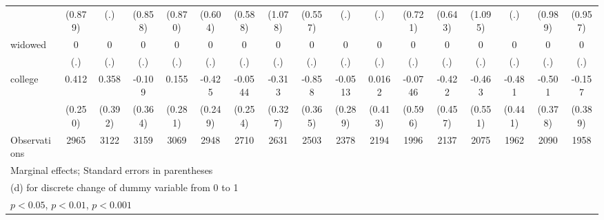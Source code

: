 {\begin{tabular}{l*{16}{c}}
                    &     (0.879)         &         (.)         &     (0.858)         &     (0.870)         &     (0.604)         &     (0.588)         &     (1.078)         &     (0.557)         &         (.)         &         (.)         &     (0.721)         &     (0.643)         &     (1.095)         &         (.)         &     (0.989)         &     (0.957)         \\
[1em]
widowed             &           0         &           0         &           0         &           0         &           0         &           0         &           0         &           0         &           0         &           0         &           0         &           0         &           0         &           0         &           0         &           0         \\
                    &         (.)         &         (.)         &         (.)         &         (.)         &         (.)         &         (.)         &         (.)         &         (.)         &         (.)         &         (.)         &         (.)         &         (.)         &         (.)         &         (.)         &         (.)         &         (.)         \\
[1em]
college             &       0.412         &       0.358         &      -0.109         &       0.155         &      -0.425         &     -0.0544         &      -0.313         &      -0.858\sym{*}  &     -0.0513         &      0.0162         &     -0.0746         &      -0.422         &      -0.463         &      -0.481         &      -0.501         &      -0.157         \\
                    &     (0.250)         &     (0.392)         &     (0.364)         &     (0.281)         &     (0.249)         &     (0.254)         &     (0.327)         &     (0.365)         &     (0.289)         &     (0.413)         &     (0.596)         &     (0.457)         &     (0.551)         &     (0.441)         &     (0.378)         &     (0.389)         \\
\hline
Observations        &        2965         &        3122         &        3159         &        3069         &        2948         &        2710         &        2631         &        2503         &        2378         &        2194         &        1996         &        2137         &        2075         &        1962         &        2090         &        1958         \\
\hline\hline
\multicolumn{17}{l}{\footnotesize Marginal effects; Standard errors in parentheses}\\
\multicolumn{17}{l}{\footnotesize  (d) for discrete change of dummy variable from 0 to 1}\\
\multicolumn{17}{l}{\footnotesize \sym{*} \(p<0.05\), \sym{**} \(p<0.01\), \sym{***} \(p<0.001\)}\\
\end{tabular}
}
